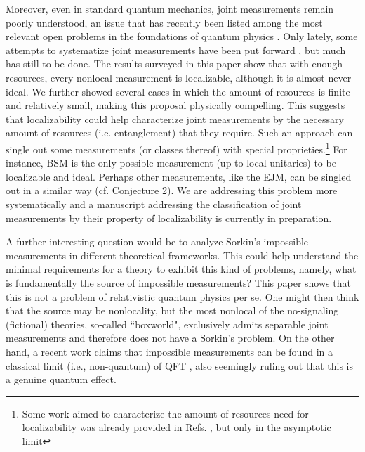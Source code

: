 \documentclass[a4paper,twocolumn,11pt,accepted=2024-02-14]{quantumarticle}
\begin{document}
Moreover, even in standard quantum mechanics, joint measurements remain poorly understood, an issue that has recently been listed among the most relevant open problems in the foundations of quantum physics   \cite{cavalcanti2023fresh}. Only lately, some attempts to systematize joint measurements have been put forward \cite{chitambar2014everything, del2023iso}, but much has still to be done. The results surveyed in this paper show that with enough resources, every nonlocal measurement is localizable, although it is almost never ideal. We further showed several cases in which the amount of resources is finite and relatively small, making this proposal physically compelling. This suggests that localizability could help characterize joint measurements by the necessary amount of resources (i.e. entanglement) that they require. Such an approach can single out some measurements (or classes thereof) with special proprieties.\footnote{Some work aimed to characterize the amount of resources need for localizability was already provided in Refs. \cite{clark2010entanglement, groisman2015optimal}, but only in the asymptotic limit} For instance, BSM is the only possible measurement (up to local unitaries) to be localizable and ideal. Perhaps other measurements, like the EJM, can be singled out in a similar way (cf. Conjecture 2). We are addressing this problem more systematically and a manuscript addressing the classification of joint measurements by their property of localizability is currently in preparation.

A further interesting question would be to analyze Sorkin's impossible measurements in different theoretical frameworks. This could help understand the minimal requirements for a theory to exhibit this kind of problems, namely, what is fundamentally the source of impossible measurements? This paper shows that this is not a problem of relativistic quantum physics per se. One might then think that the source may be nonlocality, but the most nonlocal of the no-signaling (fictional) theories, so-called ``boxworld", exclusively admits separable joint measurements \cite{eftaxias2022joint} and therefore does not have a Sorkin's problem. 
On the other hand, a recent work claims that impossible measurements can be found in a classical limit (i.e., non-quantum) of QFT \cite{much2023superluminal}, also seemingly ruling out that this is a genuine quantum effect.
\end{document}
